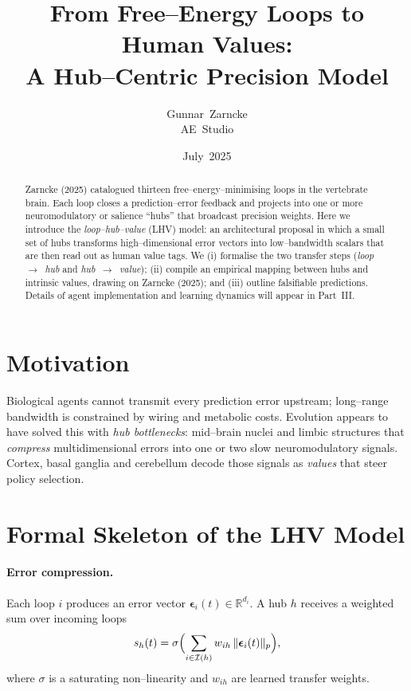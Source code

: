 \documentclass[11pt]{article}
\title{From Free--Energy Loops to Human Values:\\A Hub--Centric Precision Model}
\author{Gunnar~Zarncke\\AE~Studio}
\date{July~2025}
\begin{document}
\maketitle

\begin{abstract}
Zarncke (2025)  catalogued thirteen free--energy--minimising loops in the vertebrate brain. Each loop closes a prediction--error feedback and projects into one or more neuromodulatory or salience ``hubs'' that broadcast precision weights. Here we introduce the \emph{loop--hub--value} (LHV) model: an architectural proposal in which a small set of hubs transforms high--dimensional error vectors into low--bandwidth scalars that are then read out as human value tags. We (i) formalise the two transfer steps (\emph{loop~$\rightarrow$~hub} and \emph{hub~$\rightarrow$~value}); (ii) compile an empirical mapping between hubs and intrinsic values, drawing on Zarncke (2025); and (iii) outline falsifiable predictions. Details of agent implementation and learning dynamics will appear in Part~III.
\end{abstract}

\section{Motivation}
Biological agents cannot transmit every prediction error upstream; long--range bandwidth is constrained by wiring and metabolic costs. Evolution appears to have solved this with \emph{hub bottlenecks}: mid--brain nuclei and limbic structures that \emph{compress} multidimensional errors into one or two slow neuromodulatory signals. Cortex, basal ganglia and cerebellum decode those signals as \emph{values} that steer policy selection.

\section{Formal Skeleton of the LHV Model}
\paragraph{Error compression.} Each loop $i$ produces an error vector $\boldsymbol{\epsilon}_i(t) \in \mathbb{R}^{d_i}$. A hub $h$ receives a weighted sum over incoming loops
\begin{equation}
 s_h(t)=\sigma\Bigl(\sum_{i\in\mathcal{I}(h)} w_{ih}\,\lVert\boldsymbol{\epsilon}_i(t)\rVert_{p}\Bigr),
\end{equation}
where $\sigma$ is a saturating non--linearity and $w_{ih}$ are learned transfer weights.
\end{document}
